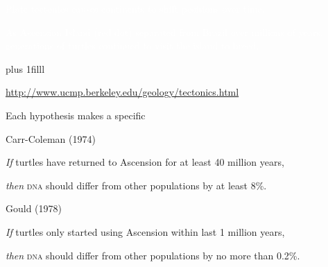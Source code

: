 \documentclass[t]{beamer}
\newcommand{\btVFill}{\vskip0pt plus 1filll}
\begin{document}
{
\begin{frame}[t]{\textcolor{white}{Plate tectonics causes continents to shift positions over time.}}
	\begin{center}
	\end{center}

	\textcolor{white}{As Ascension Island (red dot) separated from Brazil over millions of years, generations of turtles continued to visit the island to breed.}

	\btVFill

	\hfill\tiny \textcolor{white}{\url{http://www.ucmp.berkeley.edu/geology/tectonics.html}}

\end{frame}
}

\begin{frame}[t]{Each hypothesis makes a specific }
	\vspace*{-\baselineskip}


	\setlength{\columnseprule}{0.4pt}

	\begin{multicols}{2}
	
		\hangpara Carr-Coleman (1974)
	
		\hangpara \textit{If} turtles have returned to Ascension for at least 40 million years,
	
		\hangpara \textit{then} \textsc{dna} should differ from other populations by at least 8\%.
	
	\columnbreak
	
		\hangpara Gould (1978)
	
		\hangpara \textit{If} turtles only started using Ascension within last 1 million years,
	
		\hangpara \textit{then} \textsc{dna} should differ from other populations by no more than 0.2\%.	
	\end{multicols}
\end{frame}
\end{document}
